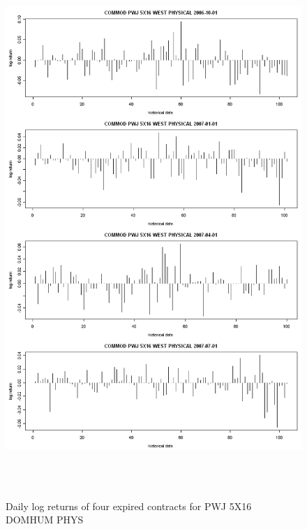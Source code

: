 \begin{figure}[htbp]
\centering
\includegraphics[width=6in, height=8in]{figures/pwj-peak-vol.png}
\caption{Daily log returns of four expired contracts for PWJ 5X16 DOMHUM PHYS}
\label{pwj-peak-vol}
\end{figure}

